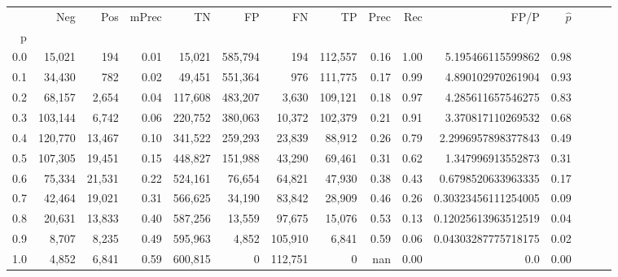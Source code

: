 \begin{tabular}{rrrrrrrrrrrrrrr}
\toprule
{} &      Neg &     Pos & mPrec &       TN &       FP &       FN &       TP &  Prec &   Rec &                 FP/P & $\hat{p}$ \\
p   &          &         &       &          &          &          &          &       &       &                      &           \\
\midrule
0.0 &   15,021 &     194 &  0.01 &   15,021 &  585,794 &      194 &  112,557 &  0.16 &  1.00 &    5.195466115599862 &      0.98 \\
0.1 &   34,430 &     782 &  0.02 &   49,451 &  551,364 &      976 &  111,775 &  0.17 &  0.99 &    4.890102970261904 &      0.93 \\
0.2 &   68,157 &   2,654 &  0.04 &  117,608 &  483,207 &    3,630 &  109,121 &  0.18 &  0.97 &    4.285611657546275 &      0.83 \\
0.3 &  103,144 &   6,742 &  0.06 &  220,752 &  380,063 &   10,372 &  102,379 &  0.21 &  0.91 &    3.370817110269532 &      0.68 \\
0.4 &  120,770 &  13,467 &  0.10 &  341,522 &  259,293 &   23,839 &   88,912 &  0.26 &  0.79 &   2.2996957898377843 &      0.49 \\
0.5 &  107,305 &  19,451 &  0.15 &  448,827 &  151,988 &   43,290 &   69,461 &  0.31 &  0.62 &    1.347996913552873 &      0.31 \\
0.6 &   75,334 &  21,531 &  0.22 &  524,161 &   76,654 &   64,821 &   47,930 &  0.38 &  0.43 &   0.6798520633963335 &      0.17 \\
0.7 &   42,464 &  19,021 &  0.31 &  566,625 &   34,190 &   83,842 &   28,909 &  0.46 &  0.26 &  0.30323456111254005 &      0.09 \\
0.8 &   20,631 &  13,833 &  0.40 &  587,256 &   13,559 &   97,675 &   15,076 &  0.53 &  0.13 &  0.12025613963512519 &      0.04 \\
0.9 &    8,707 &   8,235 &  0.49 &  595,963 &    4,852 &  105,910 &    6,841 &  0.59 &  0.06 &  0.04303287775718175 &      0.02 \\
1.0 &    4,852 &   6,841 &  0.59 &  600,815 &        0 &  112,751 &        0 &   nan &  0.00 &                  0.0 &      0.00 \\
\bottomrule
\end{tabular}
